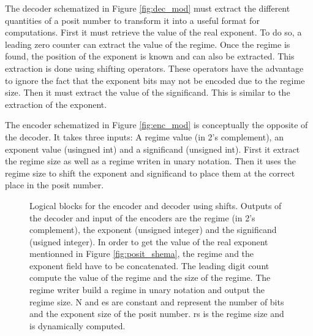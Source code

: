 The decoder schematized in Figure \ref{fig:dec_mod} must extract the different quantities of a posit number to transform it into a useful format for computations. First it must retrieve the value of the real exponent. To do so, a leading zero counter can extract the value of the regime. Once the regime is found, the position of the exponent is known and can also be extracted. This extraction is done using shifting operators. These operators have the advantage to ignore the fact that the exponent bits may not be encoded due to the regime size. Then it must extract the value of the significand. This is similar to the extraction of the exponent.

The encoder schematized in Figure \ref{fig:enc_mod} is conceptually the opposite of the decoder. It takes three inputs: A regime value (in 2's complement), an exponent value (usingned int) and a significand (unsigned int). First it extract the regime size as well as a regime writen in unary notation. Then it uses the regime size to shift the exponent and significand to place them at the correct place in the posit number.

\begin{figure}[!ht]
\begin{mdframed}
	\centering
	\subfloat[Decoder]{\label{fig:dec_mod}}

	\subfloat[Encoder]{\label{fig:enc_mod}}
	\caption{Logical blocks for the encoder and decoder using shifts. Outputs of the decoder and input of the encoders are the regime (in 2's complement), the exponent (unsigned integer) and the significand (usigned integer). In order to get the value of the real exponent mentionned in Figure \ref{fig:posit_shema}, the regime and the exponent field have to be concatenated. The leading digit count compute the value of the regime and the size of the regime. The regime writer build a regime in unary notation and output the regime size. N and es are constant and represent the number of bits and the exponent size of the posit number. rs is the regime size and is dynamically computed.}
\end{mdframed}
\end{figure}




